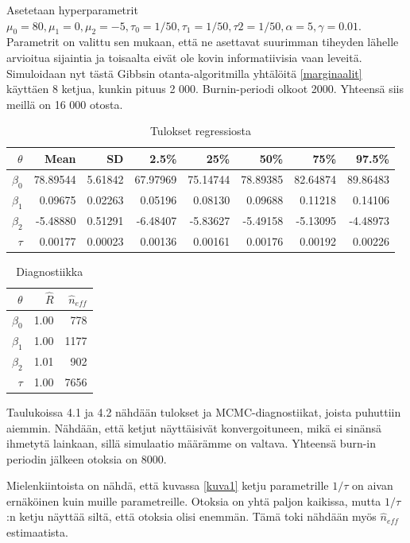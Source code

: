 Asetetaan hyperparametrit $\mu_0 = 80,\mu_1 = 0, \mu_2 = -5, \tau_0 = 1/50, \tau_1 = 1/50, \tau2 = 1/50, \alpha	= 5, \gamma = 0.01$. Parametrit on valittu sen mukaan, että ne asettavat suurimman tiheyden lähelle arvioitua sijaintia ja toisaalta eivät ole kovin informatiivisia vaan leveitä. Simuloidaan nyt tästä Gibbsin otanta-algoritmilla yhtälöitä \ref{marginaalit} käyttäen 8 ketjua, kunkin pituus 2 000. Burnin-periodi olkoot 2000. Yhteensä siis meillä on  16 000 otosta.

\begin{table}[ht]
\centering
\label{results}
\begin{tabular}{rrrrrrrr}
  \hline
 $\theta$ & Mean & SD & 2.5\% & 25\% & 50\% & 75\% & 97.5\% \\ 
  \hline
  $\beta_0$ & 78.89544 & 5.61842 & 67.97969 & 75.14744 & 78.89385 & 82.64874 & 89.86483 \\ 
  $\beta_1$ & 0.09675 & 0.02263 & 0.05196 & 0.08130 & 0.09688 & 0.11218 & 0.14106 \\ 
  $\beta_2$ & -5.48880 & 0.51291 & -6.48407 & -5.83627 & -5.49158 & -5.13095 & -4.48973 \\ 
  $\tau$ & 0.00177 & 0.00023 & 0.00136 & 0.00161 & 0.00176 & 0.00192 & 0.00226 \\ 
   \hline
\end{tabular}
\caption{Tulokset regressiosta}
\end{table}
\begin{table}[ht]\label{diagnostics}
\centering
\begin{tabular}{rrr}
  \hline
 $\theta$ & $\hat{R}$ & $\hat{n}_{eff}$ \\ 
  \hline
  $\beta_0$ & 1.00 & 778 \\ 
  $\beta_1$ & 1.00 & 1177 \\ 
  $\beta_2$ & 1.01 & 902  \\ 
  $\tau$ & 1.00 & 7656  \\ 
   \hline
\end{tabular}
\caption{Diagnostiikka}
\end{table}

Taulukoissa 4.1 ja 4.2 nähdään tulokset ja MCMC-diagnostiikat, joista puhuttiin aiemmin. Nähdään, että ketjut näyttäisivät konvergoituneen, mikä ei sinänsä ihmetytä lainkaan, sillä simulaatio määrämme on valtava. Yhteensä burn-in periodin jälkeen otoksia on 8000. 

Mielenkiintoista on nähdä, että kuvassa \ref{kuva1} ketju parametrille $1/\tau$ on aivan ernäköinen kuin muille parametreille. Otoksia on yhtä paljon kaikissa, mutta $1/\tau$:n ketju näyttää siltä, että otoksia olisi enemmän. Tämä toki nähdään myös $\hat{n}_{eff}$ estimaatista.


